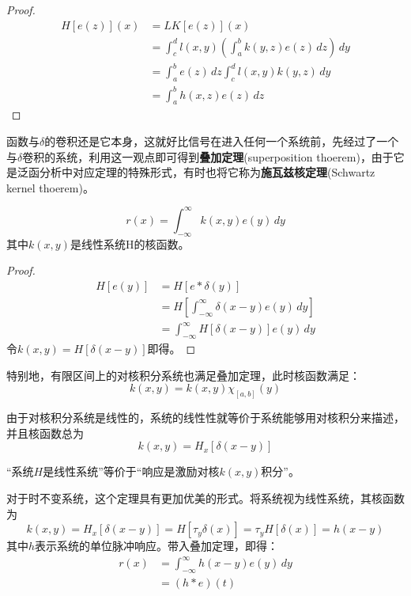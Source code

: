 \documentclass{ctexbook}
\begin{document}
\begin{proof}\begin{align*}
    H[e(z)](x)&=LK[e(z)](x)\\
    &=\int_{c}^{d}l(x,y)\left(\int_{a}^{b}k(y,z)e(z)\,dz\right)\,dy\\
    &=\int_{a}^{b}e(z)\,dz\int_{c}^{d}l(x,y)k(y,z)\,dy\\
    &=\int_{a}^{b}h(x,z)e(z)\,dz
\end{align*}
\end{proof}

函数与$\delta$的卷积还是它本身，这就好比信号在进入任何一个系统前，先经过了一个与$\delta$卷积的系统，利用这一观点即可得到\textbf{叠加定理}(superposition thoerem)\cite{brad_osgood_ee261}，由于它是泛函分析中对应定理的特殊形式，有时也将它称为\textbf{施瓦兹核定理}(Schwartz kernel thoerem)。
\begin{theorem}
    \begin{equation*}
        r(x)=\int_{-\infty}^{\infty}k(x,y)e(y)\,dy
    \end{equation*}
其中$k(x,y)$是线性系统H的核函数。
\end{theorem}
\begin{proof}\begin{align*}
    H[e(y)]&=H[e*\delta(y)]\\
    &=H\left[\int_{-\infty}^{\infty}\delta(x-y)e(y)\,dy\right]\\
    &=\int_{-\infty}^{\infty}H[\delta(x-y)]e(y)\,dy
\end{align*}
令$k(x,y)=H[\delta(x-y)]$即得。
\end{proof}

特别地，有限区间上的对核积分系统也满足叠加定理，此时核函数满足：
\[k(x,y)=k(x,y)\chi_{[a,b]}(y)\]

由于对核积分系统是线性的，系统的线性性就等价于系统能够用对核积分来描述，并且核函数总为
$$k(x,y)=H_x[\delta(x-y)]$$

\begin{proposition}[线性系统的等价定义]
    “系统$H$是线性系统”等价于“响应是激励对核$k(x,y)$积分”。
\end{proposition}

对于时不变系统，这个定理具有更加优美的形式。将系统视为线性系统，其核函数为
\[k(x,y)=H_x[\delta(x-y)]=H[\tau_y\delta(x)]=\tau_y H[\delta(x)]=h(x-y)\]
其中$h$表示系统的单位脉冲响应。带入叠加定理，即得：
\begin{align*}
    r(x)&=\int_{-\infty}^{\infty}h(x-y)e(y)\,dy\\
    &=(h*e)(t)
\end{align*}
\end{document}
